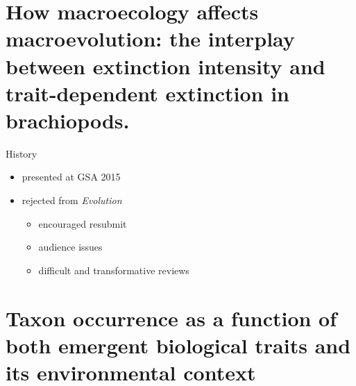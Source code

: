 \documentclass{beamer}
\title{}
\author{}
\institute{}
\date{}
\begin{document}
\begin{frame}
  \tableofcontents
\end{frame}


\section{How macroecology affects macroevolution: the interplay between extinction intensity and trait-dependent extinction in brachiopods.}

\begin{frame}
  \begin{block}{History}
    \begin{itemize}
      \item presented at GSA 2015
      \item rejected from \textit{Evolution}
        \begin{itemize}
          \item encouraged resubmit
          \item audience issues
          \item difficult and transformative reviews
        \end{itemize}
    \end{itemize}
  \end{block}
\end{frame}




\section{Taxon occurrence as a function of both emergent biological traits and its environmental context}

%   
\end{document}
